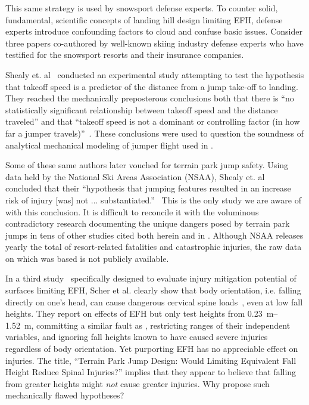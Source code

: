 \documentclass[smallextended]{svjour3}       %
\begin{document}
This same strategy is used by snowsport defense experts. To counter solid,
fundamental, scientific concepts of landing hill design limiting EFH, defense
experts introduce confounding factors to cloud and confuse basic issues.
Consider three papers \cite{Shealy2010,Shealy2015,Scher2015} co-authored by
well-known skiing industry defense experts who have testified for the snowsport
resorts and their insurance companies.

Shealy et. al~\cite{Shealy2010} conducted an experimental study attempting to
test the hypothesis that takeoff speed is a predictor of the distance from a
jump take-off to landing. They reached the mechanically preposterous
conclusions both that there is ``no statistically significant relationship
between takeoff speed and the distance traveled'' and that ``takeoff speed is
not a dominant or controlling factor (in how far a jumper
travels)''~\cite{Shealy2010}. These conclusions were used to question the
soundness of analytical mechanical modeling of jumper flight used in
\cite{Hubbard2009,McNeil2012}.

Some of these same authors later vouched for terrain park jump safety. Using
data held by the National Ski Areas Association (NSAA), Shealy et.
al~\cite{Shealy2015} concluded that their ``hypothesis that jumping features
resulted in an increase risk of injury [was] not ...
substantiated.''~\cite{Shealy2015} This is the only study we are aware of with
this conclusion. It is difficult to reconcile it with the voluminous
contradictory research documenting the unique dangers posed by terrain park
jumps in tens of other studies cited both herein and in
\cite{Hubbard2009,Swedberg2012,McNeil2012,McNeil2012a,Hubbard2015,Levy2015,Petrone2017,Moore2018}.
Although NSAA releases yearly the total of resort-related fatalities and
catastrophic injuries, the raw data on which \cite{Shealy2015} was based is not
publicly available.

In a third study~\cite{Scher2015} specifically designed to evaluate injury
mitigation potential of surfaces limiting EFH, Scher et al. clearly show that
body orientation, i.e. falling directly on one's head, can cause dangerous
cervical spine loads~\cite{Scher2015}, even at low fall heights. They report on
effects of EFH but only test heights from \SIrange{0.23}{1.52}{\meter},
committing a similar fault as \cite{Shealy2010}, restricting ranges of their
independent variables, and ignoring fall heights known to have caused severe
injuries regardless of body orientation. Yet purporting EFH has no appreciable
effect on injuries. The title, ``Terrain Park Jump Design: Would Limiting
Equivalent Fall Height Reduce Spinal Injuries?'' implies that they appear to
believe that falling from greater heights might \emph{not} cause greater
injuries. Why propose such mechanically flawed hypotheses?
\end{document}
